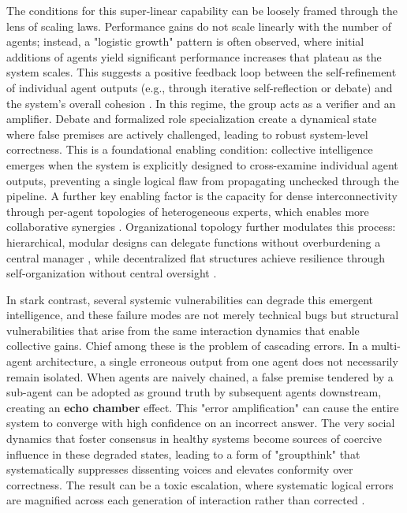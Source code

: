 \documentclass[11pt,a4paper]{article}
\begin{document}
The conditions for this super-linear capability can be loosely framed through the lens of scaling laws. Performance gains do not scale linearly with the number of agents; instead, a "logistic growth" pattern is often observed, where initial additions of agents yield significant performance increases that plateau as the system scales. This suggests a positive feedback loop between the self-refinement of individual agent outputs (e.g., through iterative self-reflection or debate) and the system's overall cohesion \cite{arxiv:2404.02183v1}. In this regime, the group acts as a verifier and an amplifier. Debate and formalized role specialization create a dynamical state where false premises are actively challenged, leading to robust system-level correctness. This is a foundational enabling condition: collective intelligence emerges when the system is explicitly designed to cross-examine individual agent outputs, preventing a single logical flaw from propagating unchecked through the pipeline. A further key enabling factor is the capacity for dense interconnectivity through per-agent topologies of heterogeneous experts, which enables more collaborative synergies \cite{arxiv:2402.04578v3,arxiv:2405.08550v1}. Organizational topology further modulates this process: hierarchical, modular designs can delegate functions without overburdening a central manager \cite{arxiv:2405.03825v1,arxiv:2403.08282v2}, while decentralized flat structures achieve resilience through self-organization without central oversight \cite{arxiv:2406.11342v3}.

In stark contrast, several systemic vulnerabilities can degrade this emergent intelligence, and these failure modes are not merely technical bugs but structural vulnerabilities that arise from the same interaction dynamics that enable collective gains. Chief among these is the problem of cascading errors. In a multi-agent architecture, a single erroneous output from one agent does not necessarily remain isolated. When agents are naively chained, a false premise tendered by a sub-agent can be adopted as ground truth by subsequent agents downstream, creating an \textbf{echo chamber} effect. This "error amplification" can cause the entire system to converge with high confidence on an incorrect answer. The very social dynamics that foster consensus in healthy systems become sources of coercive influence in these degraded states, leading to a form of "groupthink" that systematically suppresses dissenting voices and elevates conformity over correctness. The result can be a toxic escalation, where systematic logical errors are magnified across each generation of interaction rather than corrected \cite{arxiv:2403.07769v3}.
\end{document}
